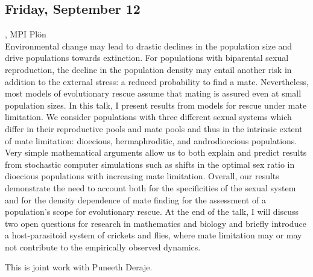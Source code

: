 \documentclass[12pt,a4paper]{article}
\begin{document}
\subsection*{\sffamily Friday, September 12}
\bigskip\bigskip
{}, MPI Plön \\[2ex] Environmental change may lead to drastic declines in the population size and drive populations towards extinction. For populations with biparental sexual reproduction, the decline in the population density may entail another risk in addition to the external stress: a reduced probability to find a mate. Nevertheless, most models of evolutionary rescue assume that mating is assured even at small population sizes. In this talk, I present results from models for rescue under mate limitation. We consider populations with three different sexual systems which differ in their reproductive pools and mate pools and thus in the intrinsic extent of mate limitation: dioecious, hermaphroditic, and androdioecious populations. Very simple mathematical arguments allow us to both explain and predict results from stochastic computer simulations such as shifts in the optimal sex ratio in dioecious populations with increasing mate limitation. Overall, our results demonstrate the need to account both for the specificities of the sexual system and for the density dependence of mate finding for the assessment of a population's scope for evolutionary rescue. At the end of the talk, I will discuss two open questions for research in mathematics and biology and briefly introduce a host-parasitoid system of crickets and flies, where mate limitation may or may not contribute to the empirically observed dynamics. 


 This is joint work with Puneeth Deraje. 

\bigskip\bigskip
\end{document}
